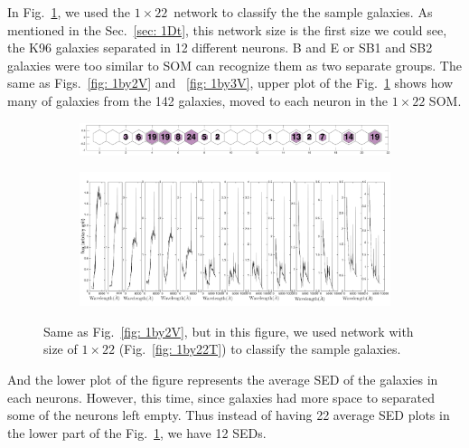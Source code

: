             In Fig.~\ref{fig: 1by22V}, we used the $1\times22$~network to classify the the sample galaxies.
            As mentioned in the Sec.~\ref{sec: 1Dt}, this network size is the first size we could see, the K96 galaxies separated in 12 different neurons.
            B and E or SB1 and SB2 galaxies were too similar to SOM can recognize them as two separate groups.
            The same as Figs.~\ref{fig: 1by2V} and ~\ref{fig: 1by3V}, upper plot of the Fig.~\ref{fig: 1by22V} shows how many of galaxies from the 142 galaxies, moved to each neuron in the $1\times22$ SOM.
            \begin{figure}
                \begin{subfigure}[b]{0.9\textwidth}
                    \centering
                    \includegraphics[width=\textwidth]{../images0.01/1d/hit_v_1_by_22.png}
                \end{subfigure}
                \hfill
                \begin{subfigure}[b]{0.9\textwidth}
                     \includegraphics[width=\textwidth]{../images0.01/1d/SED_total1by22.png}
                \end{subfigure}
                \caption{Same as Fig.~\ref{fig: 1by2V}, but in this figure, we used network with size of $1\times22$ (Fig.~\ref{fig: 1by22T}) to classify the sample galaxies.}
                \label{fig: 1by22V}
            \end{figure}
            And the lower plot of the figure represents the average SED of the galaxies in each neurons.
            However, this time, since galaxies had more space to separated some of the neurons left empty. 
            Thus instead of having 22 average SED plots in the lower part of the Fig.~\ref{fig: 1by22V}, we have 12 SEDs.
            
